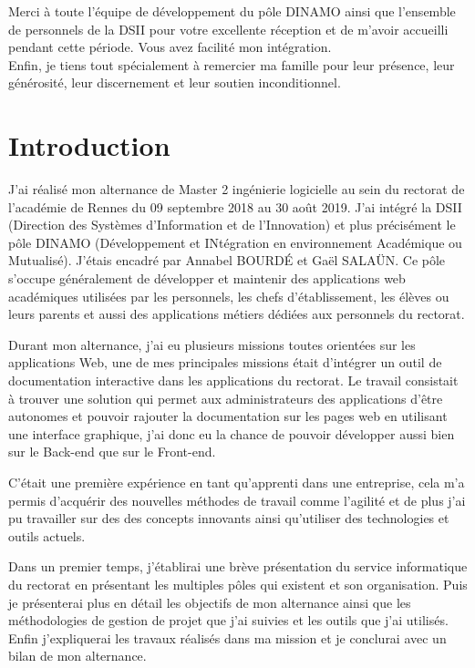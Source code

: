 \documentclass[12pt]{article}
\begin{document}
Merci à toute l'équipe de développement du pôle DINAMO ainsi que l'ensemble de personnels de la DSII pour votre excellente réception et de m'avoir accueilli pendant cette période. Vous avez facilité mon intégration. \\

Enfin, je tiens tout spécialement à remercier ma famille pour leur présence, leur générosité, leur discernement et leur soutien inconditionnel. 

\newpage


\section{Introduction}

J'ai réalisé mon alternance de Master 2 ingénierie logicielle au sein du rectorat de l'académie de Rennes du 09 septembre 2018 au 30 août 2019. J'ai intégré la DSII (Direction des Systèmes d'Information et de l'Innovation) et plus précisément le pôle DINAMO (Développement et INtégration en environnement Académique ou Mutualisé). J'étais encadré par Annabel BOURDÉ et Gaël SALAÜN. Ce pôle s'occupe généralement de développer et maintenir des applications web académiques utilisées par les personnels, les chefs d'établissement, les élèves  ou leurs parents et aussi des applications métiers dédiées aux personnels du rectorat.\newline


Durant mon alternance, j'ai eu plusieurs missions toutes orientées sur les  applications Web, une de mes principales missions était d'intégrer un outil de documentation interactive dans les applications du rectorat. Le travail consistait à trouver une solution qui permet aux administrateurs des applications d'être autonomes et pouvoir rajouter la documentation sur les pages web en utilisant une interface graphique, j'ai donc eu la chance de pouvoir développer aussi bien sur le Back-end que sur le Front-end.\newline   

C'était une première expérience en tant qu'apprenti dans une entreprise, cela m'a permis d'acquérir des nouvelles méthodes de travail comme l'agilité et de plus j'ai pu travailler sur des des concepts innovants ainsi qu'utiliser des technologies et outils actuels.\newline


Dans un premier temps, j'établirai une brève présentation du service informatique du rectorat en présentant les multiples pôles qui existent et son organisation. Puis je présenterai plus en détail les objectifs de mon alternance ainsi que les méthodologies de gestion de projet que j'ai suivies et les outils que j'ai utilisés. Enfin j'expliquerai les travaux réalisés dans ma mission et je conclurai avec un bilan de mon alternance.
\end{document}
